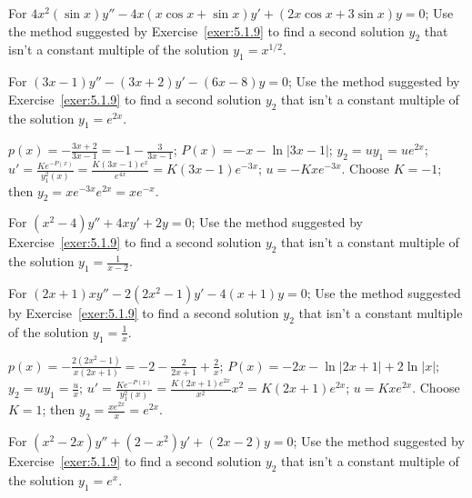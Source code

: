 \documentclass{ximera}
\begin{document}
\begin{problem}\label{exer:5.1.19}
For $4x^2(\sin x)y''-4x(x\cos x+\sin x)y'+(2x\cos x+3\sin x)y=0$; Use the
method suggested by Exercise~\ref{exer:5.1.9} to find a second solution
$y_2$  that isn't  a constant multiple of the  solution $y_1=x^{1/2}$.
\end{problem}

\begin{problem}\label{exer:5.1.20}
For $(3x-1)y''-(3x+2)y'-(6x-8)y=0$; Use the
method suggested by Exercise~\ref{exer:5.1.9} to find a second solution
$y_2$  that isn't  a constant multiple of the  solution $y_1=e^{2x}$.

\begin{solution}
    $p(x)=-\frac{3x+2}{3x-1}=-1-\frac{3}{3x-1}$;\;
$P(x)=-x-\ln|3x-1|$;\;
$y_2=uy_1=ue^{2x}$;\;
$u'=\frac{Ke^{-P(x)}}{ y_1^2(x)}=\frac{K(3x-1)e^x}{
e^{4x}}=K(3x-1)e^{-3x}$;\;
$u=-Kxe^{-3x}$.
Choose $K=-1$; then
$y_2=xe^{-3x}e^{2x}=xe^{-x}$.
\end{solution}
\end{problem}


\begin{problem}\label{exer:5.1.21}
For $(x^2-4)y''+4xy'+2y=0$;  Use the
method suggested by Exercise~\ref{exer:5.1.9} to find a second solution
$y_2$  that isn't  a constant multiple of the  solution $y_1=\frac{1}{x-2}$.
\end{problem}


\begin{problem}\label{exer:5.1.22}
For $(2x+1)xy''-2(2x^2-1)y'-4(x+1)y=0$;  Use the
method suggested by Exercise~\ref{exer:5.1.9} to find a second solution
$y_2$  that isn't  a constant multiple of the  solution $y_1=\frac{1}{x}$.

\begin{solution}
    $p(x)=-\frac{2(2x^2-1)}{
x(2x+1)}=-2-\frac{2}{2x+1}+\frac{2}{ x}$;\;
$P(x)=-2x-\ln|2x+1|+2\ln|x|$;\;
$y_2=uy_1=\frac{u}{ x}$;\;
$u'=\frac{Ke^{-P(x)}}{ y_1^2(x)}=\frac{K(2x+1)e^{2x}}{
x^2}x^2=K(2x+1)e^{2x}$;\;
$u=Kxe^{2x}$.
Choose $K=1$; then
$y_2=\frac{xe^{2x}}{ x}=e^{2x}$.
\end{solution}
\end{problem}

\begin{problem}\label{exer:5.1.23}
For $(x^2-2x)y''+(2-x^2)y'+(2x-2)y=0$;  Use the
method suggested by Exercise~\ref{exer:5.1.9} to find a second solution
$y_2$  that isn't  a constant multiple of the  solution $y_1=e^x$.
\end{problem}
\end{document}
